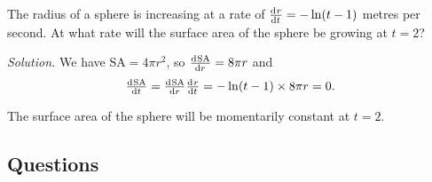 \begin{ex}
  The radius of a sphere is increasing at a rate of $ \od{r}{t} = -\ln(t - 1) $ metres per second. At what rate will the surface area of
  the sphere be growing at $ t = 2 $?

  \textit{Solution.} We have $ \mathrm{SA} = 4\pi r^2 $, so $ \od{\mathrm{SA}}{r} = 8\pi r $ and
    \begin{displaymath}
      \od{\mathrm{SA}}{t} = \od{\mathrm{SA}}{r} \od{r}{t} = -\ln(t - 1) \times 8\pi r = 0.
    \end{displaymath}

    The surface area of the sphere will be momentarily constant at $ t = 2 $.
\end{ex}

\subsection*{Questions}
